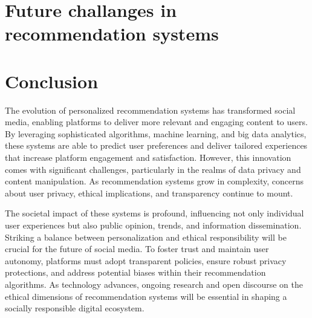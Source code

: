 \documentclass[10pt,twocolumn,twoside,a4paper]{article} %
\begin{document}
\section{Future challanges in recommendation systems} \label{future_challanges}

\section{Conclusion} \label{conclusion}
The evolution of personalized recommendation systems has transformed social media, enabling platforms to deliver more relevant and engaging content to users. By leveraging sophisticated algorithms, machine learning, and big data analytics, these systems are able to predict user preferences and deliver tailored experiences that increase platform engagement and satisfaction. However, this innovation comes with significant challenges, particularly in the realms of data privacy and content manipulation. As recommendation systems grow in complexity, concerns about user privacy, ethical implications, and transparency continue to mount. 

The societal impact of these systems is profound, influencing not only individual user experiences but also public opinion, trends, and information dissemination. Striking a balance between personalization and ethical responsibility will be crucial for the future of social media. To foster trust and maintain user autonomy, platforms must adopt transparent policies, ensure robust privacy protections, and address potential biases within their recommendation algorithms. As technology advances, ongoing research and open discourse on the ethical dimensions of recommendation systems will be essential in shaping a socially responsible digital ecosystem.

\nocite{*}


\end{document}
